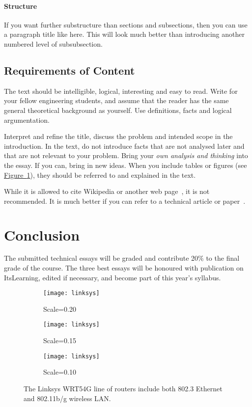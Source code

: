 \documentclass[a4paper,11pt]{article}
\begin{document}
\paragraph{Structure}  If you want  further substructure than sections and subsections, then you can use
a paragraph title like here.  This will look much better than introducing another numbered level of subsubsection.

\subsection{Requirements of Content}
 The text should be intelligible, logical, interesting and easy to read. Write for
your fellow engineering students, and assume that the reader has the same general theoretical
background as yourself. Use definitions, facts and logical argumentation. 

Interpret and refine the title, discuss the problem and intended scope in the
introduction. In the text, do not introduce facts that are not analysed later and
that are not relevant to your problem. Bring your \emph{own analysis and thinking} into
the essay. If you can, bring in new ideas. When you include tables or figures (see \hyperref[fig:linksys]{Figure~\ref*{fig:linksys}}), 
they should be referred to and explained in the text.

While it is allowed to cite Wikipedia or another web page~\cite{Wikipedia:citation,Daborn}, 
it is not recommended.
It is much better if you can refer to a technical article or paper~\cite{Kortvedt:2009}.

\section{Conclusion}
The submitted technical essays will be graded and contribute 20\% to the final grade of the course. The three best essays will be honoured with publication on ItsLearning, edited if necessary, and become part of this year's syllabus.

\begin{figure}[hbp]
	\centering
	\begin{subfigure}[b]{0.3\textwidth}
		\centering
		\texttt{[image: linksys]}
		\caption{Scale=0.20}
	\end{subfigure}
	\begin{subfigure}[b]{0.3\textwidth}
		\centering		
		\texttt{[image: linksys]}
		\caption{Scale=0.15}	
	\end{subfigure}
	\begin{subfigure}[b]{0.3\textwidth}
		\centering		
		\texttt{[image: linksys]}
		\caption{Scale=0.10}
	\end{subfigure}
	\caption{The Linksys WRT54G line of routers include both  802.3 Ethernet and 802.11b/g wireless LAN.}
	\label{fig:linksys}
\end{figure}
\end{document}
